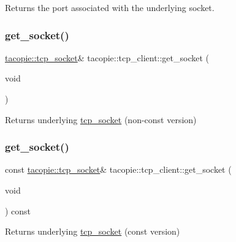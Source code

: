 \begin{DoxyReturn}{Returns}
the port associated with the underlying socket. 
\end{DoxyReturn}
\mbox{\label{classtacopie_1_1tcp__client_a1a3834deb1d263ec5816066f74286298}} 
\subsubsection{\texorpdfstring{get\+\_\+socket()}{get\_socket()}\hspace{0.1cm}{\footnotesize\ttfamily [1/2]}}
{\footnotesize\ttfamily \hyperlink{classtacopie_1_1tcp__socket}{tacopie\+::tcp\+\_\+socket}\& tacopie\+::tcp\+\_\+client\+::get\+\_\+socket (\begin{DoxyParamCaption}\item[{void}]{ }\end{DoxyParamCaption})}

\begin{DoxyReturn}{Returns}
underlying \hyperlink{classtacopie_1_1tcp__socket}{tcp\+\_\+socket} (non-\/const version) 
\end{DoxyReturn}
\mbox{\label{classtacopie_1_1tcp__client_a9cf1f3ccf43f9a0a883a17b15e3668d6}} 
\subsubsection{\texorpdfstring{get\+\_\+socket()}{get\_socket()}\hspace{0.1cm}{\footnotesize\ttfamily [2/2]}}
{\footnotesize\ttfamily const \hyperlink{classtacopie_1_1tcp__socket}{tacopie\+::tcp\+\_\+socket}\& tacopie\+::tcp\+\_\+client\+::get\+\_\+socket (\begin{DoxyParamCaption}\item[{void}]{ }\end{DoxyParamCaption}) const}

\begin{DoxyReturn}{Returns}
underlying \hyperlink{classtacopie_1_1tcp__socket}{tcp\+\_\+socket} (const version) 
\end{DoxyReturn}
\mbox{\label{classtacopie_1_1tcp__client_a79f2191e28e97b71da3a9e402134673f}} 
